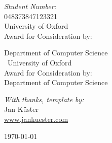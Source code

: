 \begin{titlepage}
\begin{center}
\noindent
\begin{minipage}{0.4\textwidth}
\begin{flushleft} \large
\emph{Student Number:} \\
048373847123321\\
University of Oxford \\
Award for Consideration by:\\
\begin{tabular} \hline
Department of Computer Science\\ 
\ University of Oxford \\
Award for Consideration by:\\
Department of Computer Science\\
\end{tabular}
\end{flushleft}
\end{minipage}%
\begin{minipage}{0.4\textwidth}
\begin{flushright} \large
\emph{With thanks, template by:}\\
Jan  Küster\\
\url{www.jankuester.com}\\
\end{flushright}
\end{minipage}

\vfill


{\large \today}

\vfill



\vfill
\end{center}
\end{titlepage}

